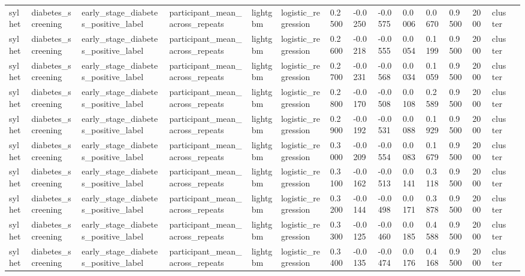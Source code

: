 \begin{tabular}{lllllllllllllll}
sylhet & diabetes\_screening & early\_stage\_diabetes\_positive\_label & participant\_mean\_across\_repeats & lightgbm & logistic\_regression & 0.2500 & -0.0250 & -0.0575 & 0.0006 & 0.0670 & 0.9500 & 2000 & cluster &  \\
sylhet & diabetes\_screening & early\_stage\_diabetes\_positive\_label & participant\_mean\_across\_repeats & lightgbm & logistic\_regression & 0.2600 & -0.0218 & -0.0555 & 0.0054 & 0.1199 & 0.9500 & 2000 & cluster &  \\
sylhet & diabetes\_screening & early\_stage\_diabetes\_positive\_label & participant\_mean\_across\_repeats & lightgbm & logistic\_regression & 0.2700 & -0.0231 & -0.0568 & 0.0034 & 0.1059 & 0.9500 & 2000 & cluster &  \\
sylhet & diabetes\_screening & early\_stage\_diabetes\_positive\_label & participant\_mean\_across\_repeats & lightgbm & logistic\_regression & 0.2800 & -0.0170 & -0.0508 & 0.0108 & 0.2589 & 0.9500 & 2000 & cluster &  \\
sylhet & diabetes\_screening & early\_stage\_diabetes\_positive\_label & participant\_mean\_across\_repeats & lightgbm & logistic\_regression & 0.2900 & -0.0192 & -0.0531 & 0.0088 & 0.1929 & 0.9500 & 2000 & cluster &  \\
sylhet & diabetes\_screening & early\_stage\_diabetes\_positive\_label & participant\_mean\_across\_repeats & lightgbm & logistic\_regression & 0.3000 & -0.0209 & -0.0554 & 0.0083 & 0.1679 & 0.9500 & 2000 & cluster &  \\
sylhet & diabetes\_screening & early\_stage\_diabetes\_positive\_label & participant\_mean\_across\_repeats & lightgbm & logistic\_regression & 0.3100 & -0.0162 & -0.0513 & 0.0141 & 0.3118 & 0.9500 & 2000 & cluster &  \\
sylhet & diabetes\_screening & early\_stage\_diabetes\_positive\_label & participant\_mean\_across\_repeats & lightgbm & logistic\_regression & 0.3200 & -0.0144 & -0.0498 & 0.0171 & 0.3878 & 0.9500 & 2000 & cluster &  \\
sylhet & diabetes\_screening & early\_stage\_diabetes\_positive\_label & participant\_mean\_across\_repeats & lightgbm & logistic\_regression & 0.3300 & -0.0125 & -0.0460 & 0.0185 & 0.4588 & 0.9500 & 2000 & cluster &  \\
sylhet & diabetes\_screening & early\_stage\_diabetes\_positive\_label & participant\_mean\_across\_repeats & lightgbm & logistic\_regression & 0.3400 & -0.0135 & -0.0474 & 0.0176 & 0.4168 & 0.9500 & 2000 & cluster &  \\

\end{tabular}
